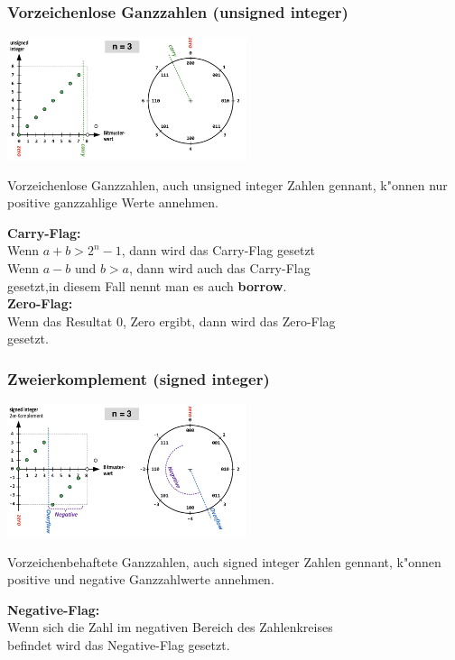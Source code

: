 \begin{minipage}[t]{10cm}
	\vspace{-4ex}
	\subsubsection{Vorzeichenlose Ganzzahlen (unsigned integer)}
	\includegraphics[width=7cm]{pics/Unsigned-Zahl}
	
	Vorzeichenlose Ganzzahlen, auch unsigned integer Zahlen gennant, k"onnen nur positive ganzzahlige Werte annehmen.
	\begin{tabbing}
		\textbf{Ca}\= \textbf{rry-Flag:}\\
		\> Wenn $a + b > 2^n -1$, dann wird das Carry-Flag gesetzt\\
		\> Wenn $a - b$ und $b > a$, dann wird auch das Carry-Flag\\
		\> gesetzt,in diesem Fall nennt man es auch \textbf{borrow}.\\

		\textbf{Zero-Flag:}\\
		\> Wenn das Resultat 0, Zero ergibt, dann wird das Zero-Flag\\ 
		\> gesetzt.
	\end{tabbing}

	\subsubsection{Zweierkomplement (signed integer)}
	\includegraphics[width=7cm]{pics/Signed-Zahl}
	
	Vorzeichenbehaftete Ganzzahlen, auch signed integer Zahlen gennant, k"onnen positive und negative Ganzzahlwerte annehmen.
	\vspace{-2ex}
	\begin{tabbing}
		\textbf{Ne}\= \textbf{gative-Flag:}\\
		\> Wenn sich die Zahl im negativen Bereich des Zahlenkreises\\ 
		\> befindet wird das Negative-Flag gesetzt.\\


\end{tabbing}
\end{minipage}
